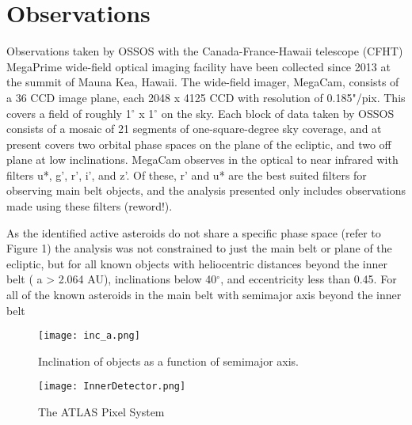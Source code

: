 \documentclass[iop,apj]{emulateapj}
\begin{document}


\section{Observations}

Observations taken by OSSOS with the Canada-France-Hawaii telescope (CFHT) MegaPrime wide-field optical imaging facility have been collected since 2013 at the summit of Mauna Kea, Hawaii. The wide-field imager, MegaCam, consists of a 36 CCD image plane, each 2048 x 4125 CCD with resolution of 0.185"/pix. This covers a field of  roughly 1$^{\circ}$ x 1$^{\circ}$ on the sky. Each block of data taken by OSSOS consists of a mosaic of 21 segments of one-square-degree sky coverage, and at present covers two orbital phase spaces on the plane of the ecliptic, and two off plane at low inclinations. MegaCam observes in the optical to near infrared with filters u*, g', r', i', and z'. Of these, r' and u* are the best suited filters for observing main belt objects, and the analysis presented only includes observations made using these filters (reword!). 




As the identified active asteroids do not share a specific phase space (refer to Figure 1) the analysis was not constrained to just the main belt or plane of the ecliptic, but for all known objects with heliocentric distances beyond the inner belt ( a > 2.064 AU), inclinations below 40$^{\circ}$, and eccentricity less than 0.45. 
For all of the known asteroids in the main belt with semimajor axis beyond the inner belt









\begin{figure}[!htb]
    \centering
    \texttt{[image: inc\_a.png]}
    \caption{Inclination of objects as a function of semimajor axis. }\label{fig:1}
\endminipage
{}
    \centering
    \texttt{[image: InnerDetector.png]}
    \caption{The ATLAS Pixel System}\label{fig:2}
\endminipage\hfill
\end{figure}
\end{document}
